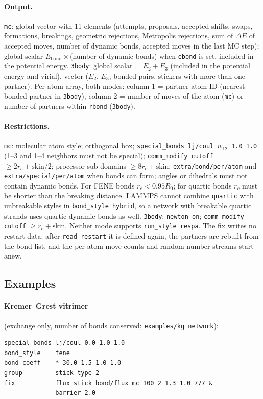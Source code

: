 \documentclass[a4paper]{tufte-handout}
\newcommand{\cmd}[1]{\texttt{#1}}
\begin{document}
\paragraph{Output.}
\cmd{mc}: global vector with 11 elements (attempts, proposals, accepted shifts, swaps,
formations, breakings, geometric rejections, Metropolis rejections, sum of $\Delta E$ of accepted
moves, number of dynamic bonds, accepted moves in the last MC step); global scalar
$E_\text{bond}\times$(number of dynamic bonds) when \cmd{ebond} is set, included in the potential
energy. \cmd{3body}: global scalar = $E_2 + E_3$ (included in the potential energy and virial),
vector ($E_2$, $E_3$, bonded pairs, stickers with more than one partner). Per-atom array, both
modes: column 1 = partner atom ID (nearest bonded partner in \cmd{3body}), column 2 = number of
moves of the atom (\cmd{mc}) or number of partners within \cmd{rbond} (\cmd{3body}).

\paragraph{Restrictions.}
\cmd{mc}: molecular atom style; orthogonal box; \cmd{special\_bonds lj/coul $w_{12}$ 1.0 1.0}
(1--3 and 1--4 neighbors must not be special); \cmd{comm\_modify cutoff} $\ge 2r_c + \text{skin}/2$;
processor sub-domains $\ge 8r_c + \text{skin}$; \cmd{extra/bond/per/atom} and
\cmd{extra/special/per/atom} when bonds can form; angles or dihedrals must not contain dynamic bonds.
For FENE bonds $r_c < 0.95R_0$; for quartic bonds $r_c$ must be shorter than the breaking distance.
LAMMPS cannot combine \cmd{quartic} with unbreakable styles in \cmd{bond\_style hybrid}, so a network
with breakable quartic strands uses quartic dynamic bonds as well. \cmd{3body}: \cmd{newton on};
\cmd{comm\_modify cutoff} $\ge r_c + \text{skin}$. Neither mode supports \cmd{run\_style respa}.
The fix writes no restart data: after \cmd{read\_restart} it is defined again, the partners are
rebuilt from the bond list, and the per-atom move counts and random number streams start anew.

\subsection{Examples}

\paragraph{Kremer--Grest vitrimer} (exchange only, number of bonds conserved; \cmd{examples/kg\_network}):
\begin{lstlisting}
special_bonds lj/coul 0.0 1.0 1.0
bond_style    fene
bond_coeff    * 30.0 1.5 1.0 1.0
group         stick type 2
fix           flux stick bond/flux mc 100 2 1.3 1.0 777 &
              barrier 2.0
\end{lstlisting}
\end{document}
